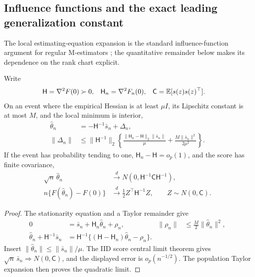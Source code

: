\subsection{Influence functions and the exact leading generalization constant}
The local estimating-equation expansion is the standard influence-function
argument for regular M-estimators \cite{vandervaart1998asymptotic}; the
quantitative remainder below makes its dependence on the rank chart explicit.
\begin{theorem}
\label{thm:local-influence}
Write
\begin{align}
\mathsf H&=\nabla^2F(0)\succ0,&
\mathsf H_n&=\nabla^2F_n(0),&
\mathsf C&=\mathbb E[s(z)s(z)^\top].
\end{align}
On an event where the empirical Hessian is at least $\mu I$,
its Lipschitz constant is at most $M$, and the local minimum is
interior,
\begin{align}
\widehat\theta_n&=-\mathsf H^{-1}\bar s_n+\Delta_n,\\
\|\Delta_n\|
&\leq\|\mathsf H^{-1}\|_2
\left\{\frac{\|\mathsf H_n-\mathsf H\|_2\|\bar s_n\|}{\mu}
+\frac{M\|\bar s_n\|^2}{2\mu^2}\right\}.
\label{eq:local-influence}
\end{align}
If the event has probability tending to one,
$\mathsf H_n-\mathsf H=o_p(1)$, and the score has finite covariance,
\begin{align}
\sqrt n\,\widehat\theta_n
&\xrightarrow{\ d\ }N(0,\mathsf H^{-1}\mathsf C\mathsf H^{-1}),\\
n\{F(\widehat\theta_n)-F(0)\}
&\xrightarrow{\ d\ }
\tfrac12 Z^\top\mathsf H^{-1}Z,\qquad Z\sim N(0,\mathsf C).
\label{eq:local-influence-clt}
\end{align}
\end{theorem}
\begin{proof}
The stationarity equation and a Taylor remainder give
\begin{align}
0&=\bar s_n+\mathsf H_n\widehat\theta_n+\rho_n,&
\|\rho_n\|&\leq\tfrac M2\|\widehat\theta_n\|^2,\\
\widehat\theta_n+\mathsf H^{-1}\bar s_n
&=\mathsf H^{-1}
\{(\mathsf H-\mathsf H_n)\widehat\theta_n-\rho_n\}.
\end{align}
Insert $\|\widehat\theta_n\|\leq\|\bar s_n\|/\mu$.
The IID score central limit theorem gives
$\sqrt n\,\bar s_n\Rightarrow N(0,\mathsf C)$, and the displayed
error is $o_p(n^{-1/2})$.
The population Taylor expansion then proves the quadratic limit.
\end{proof}

